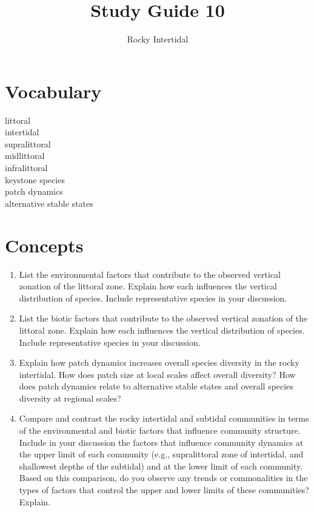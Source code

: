 \documentclass[nofonts, letterpaper]{tufte-handout}
\title{Study Guide 10}
\author{Rocky Intertidal}
\date{} %
\begin{document}
\maketitle	%


\section{Vocabulary}
\vspace{-1\baselineskip}
\begin{multicols}{2}
littoral \\
intertidal \\
supralittoral \\
midlittoral \\
infralittoral \\
keystone species \\
patch dynamics \\
alternative stable states
\end{multicols}

\section{Concepts}

\begin{enumerate}
\item
  List the environmental factors that contribute to the observed
  vertical zonation of the littoral zone. Explain how each influences
  the vertical distribution of species. Include representative species
  in your discussion.
\item
  List the biotic factors that contribute to the observed vertical
  zonation of the littoral zone. Explain how each influences the
  vertical distribution of species. Include representative species in
  your discussion.
\item
  Explain how patch dynamics increases overall species diversity in the
  rocky intertidal. How does patch size at local scales affect overall
  diversity? How does patch dynamics relate to alternative stable states
  and overall species diversity at regional scales?
\item
  Compare and contrast the rocky intertidal and subtidal communities in
  terms of the environmental and biotic factors that influence community
  structure. Include in your discussion the factors that influence
  community dynamics at the upper limit of each community (e.g.,
  supralittoral zone of intertidal, and shallowest depths of the
  subtidal) and at the lower limit of each community. Based on this
  comparison, do you observe any trends or commonalities in the types of
  factors that control the upper and lower limits of these communities?
  Explain.
\end{enumerate}
\end{document}
